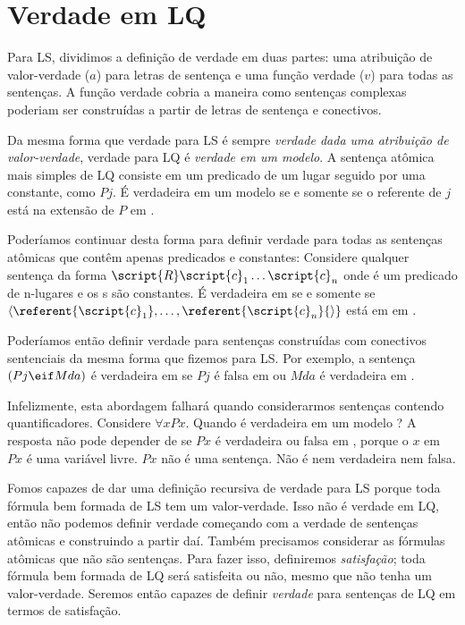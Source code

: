 \section{Verdade em LQ}
\label{sec.TruthInQL}
Para LS, dividimos a definição de verdade em duas partes: uma atribuição de valor-verdade ($a$) para letras de sentença e uma função verdade ($v$) para todas as sentenças. A função verdade cobria a maneira como sentenças complexas poderiam ser construídas a partir de letras de sentença e conectivos.

Da mesma forma que verdade para LS é sempre \emph{verdade dada uma atribuição de valor-verdade}, verdade para LQ é \emph{verdade em um modelo}. A sentença atômica mais simples de LQ consiste em um predicado de um lugar seguido por uma constante, como $Pj$. É verdadeira em um modelo  se e somente se o referente de $j$ está na extensão de $P$ em .

Poderíamos continuar desta forma para definir verdade para todas as sentenças atômicas que contêm apenas predicados e constantes: Considere qualquer sentença da forma $\script{R}\script{c}_1\ldots\script{c}_n$ onde  é um predicado de n-lugares e os s são constantes. É verdadeira em  se e somente se ${\langle}\referent{\script{c}_1},\ldots,\referent{\script{c}_n}{\rangle}$ está em  em .

Poderíamos então definir verdade para sentenças construídas com conectivos sentenciais da mesma forma que fizemos para LS. Por exemplo, a sentença $(Pj \eif Mda)$ é verdadeira em  se $Pj$ é falsa em  ou $Mda$ é verdadeira em .

Infelizmente, esta abordagem falhará quando considerarmos sentenças contendo quantificadores. Considere $\forall x Px$. Quando é verdadeira em um modelo ? A resposta não pode depender de se $Px$ é verdadeira ou falsa em , porque o $x$ em $Px$ é uma variável livre. $Px$ não é uma sentença. Não é nem verdadeira nem falsa.

Fomos capazes de dar uma definição recursiva de verdade para LS porque toda fórmula bem formada de LS tem um valor-verdade. Isso não é verdade em LQ, então não podemos definir verdade começando com a verdade de sentenças atômicas e construindo a partir daí. Também precisamos considerar as fórmulas atômicas que não são sentenças. Para fazer isso, definiremos \emph{satisfação}; toda fórmula bem formada de LQ será satisfeita ou não, mesmo que não tenha um valor-verdade. Seremos então capazes de definir \emph{verdade} para sentenças de LQ em termos de satisfação.

